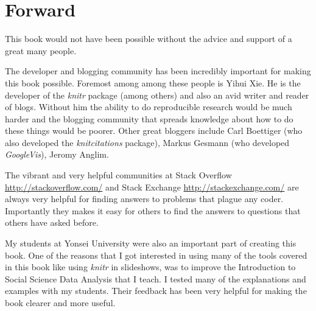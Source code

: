 


\chapter*{Forward}

This book would not have been possible without the advice and support of a great many people.

The developer and blogging community has been incredibly important for making this book possible. Foremost among among these people is Yihui Xie. He is the developer of the {\emph{knitr}} package (among others) and also an avid writer and reader of blogs. Without him the ability to do reproducible research would be much harder and the blogging community that spreads knowledge about how to do these things would be poorer. Other great bloggers include Carl Boettiger (who also developed the {\emph{knitcitations}} package), Markus Gesmann (who developed {\emph{GoogleVis}}), Jeromy Anglim.

The vibrant and very helpful communities at Stack Overflow \url{http://stackoverflow.com/} and Stack Exchange \url{http://stackexchange.com/} are always very helpful for finding answers to problems that plague any coder. Importantly they makes it easy for others to find the answers to questions that others have asked before.

My students at Yonsei University were also an important part of creating this book. One of the reasons that I got interested in using many of the tools covered in this book like using {\emph{knitr}} in slideshows, was to improve the Introduction to Social Science Data Analysis that I teach. I tested many of the explanations and examples with my students. Their feedback has been very helpful for making the book clearer and more useful.
